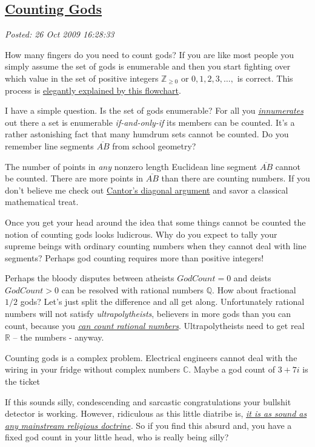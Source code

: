 %

\subsection*{\href{https://bakerjd99.wordpress.com/2009/10/26/counting-gods/}{Counting Gods}}


\noindent\emph{Posted: 26 Oct 2009 16:28:33}
\vspace{6pt}

How many fingers do you need to count gods? If you are like most people
you simply assume the set of gods is enumerable and then you start
fighting over which value in the set of positive integers $\mathbb{Z}_{\geq0}$
or ${0, 1, 2, 3, \ldots, }$ is correct. This process is
\href{http://conceptcontrol.smugmug.com/photos/1123810114\_ARzWN-L.jpg}{elegantly
explained by this flowchart}.

I have a simple question. Is the set of gods enumerable? For all you
\href{http://www.aolsvc.merriam-webster.aol.com/dictionary/innumerate}{\emph{innumerates}} out
there a set is enumerable \emph{if-and-only-if} its members can be
counted. It's a rather astonishing fact that many humdrum sets cannot be
counted. Do you remember line segments $\overline{AB}$ from school
geometry?

The number of points in \emph{any} nonzero length Euclidean line segment
$\overline{AB}$ cannot be counted. There are more points in $\overline{AB}$
than there are counting numbers. If you don't believe me check out
\href{http://en.wikipedia.org/wiki/Cantor's\_diagonal\_argument}{Cantor's
diagonal argument} and savor a classical mathematical treat.

Once you get your head around the idea that some things cannot be
counted the notion of counting gods looks ludicrous. Why do you expect
to tally your supreme beings with ordinary counting numbers when they
cannot deal with line segments? Perhaps god counting requires more than
positive integers!

Perhaps the bloody disputes between atheists $GodCount=0$ and deists
$GodCount > 0$ can be resolved with rational numbers $\mathbb{Q}$. How
about fractional $1/2$ gods? Let's just split the difference and
all get along. Unfortunately rational numbers will not satisfy
\emph{ultrapolytheists}, believers in more gods than you can count,
because you
\emph{\href{http://www.homeschoolmath.net/teaching/rational-numbers-countable.php}{can
count rational numbers}}. Ultrapolytheists need to get real
$\mathbb{R}$ -- the numbers - anyway.

Counting gods is a complex problem. Electrical engineers cannot deal
with the wiring in your fridge without complex numbers $\mathbb{C}$.
Maybe a god count of $3 + 7i$ is the ticket

If this sounds silly, condescending and sarcastic congratulations your
bullshit detector is working. However, ridiculous as this little
diatribe is, \emph{\href{http://www.ffrf.org/}{it is as sound as any
mainstream religious doctrine}.} So if you find this absurd and, you
have a fixed god count in your little head, who is really being silly?


%